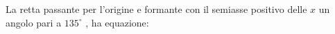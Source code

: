La retta passante per l’origine e formante con il semiasse positivo 
delle \( \displaystyle x\) un angolo pari a \( \displaystyle 135^{\circ}\) , ha
equazione: 